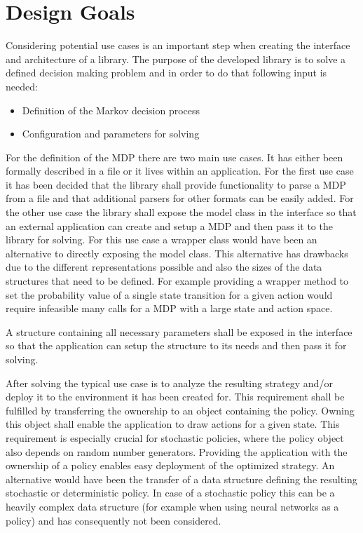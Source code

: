 \chapter {Design Goals}
\label{goals}

Considering potential use cases is an important step when creating the interface and architecture of a library. The purpose of the developed library is to solve a defined decision making problem and in order to do that following input is needed:

\begin{itemize}
	\item Definition of the Markov decision process
	\item Configuration and parameters for solving
\end{itemize}

For the definition of the MDP there are two main use cases. It has either been formally described in a file or it lives within an application. For the first use case it has been decided that the library shall provide functionality to parse a MDP from a file and that additional parsers for other formats can be easily added. For the other use case the library shall expose the model class in the interface so that an external application can create and setup a MDP and then pass it to the library for solving. For this use case a wrapper class would have been an alternative to directly exposing the model class. This alternative has drawbacks due to the different representations possible and also the sizes of the data structures that need to be defined. For example providing a wrapper method to set the probability value of a single state transition for a given action would require infeasible many calls for a MDP with a large state and action space. 

A structure containing all necessary parameters shall be exposed in the interface so that the application can setup the structure to its needs and then pass it for solving. 

After solving the typical use case is to analyze the resulting strategy and/or deploy it to the environment it has been created for. This requirement shall be fulfilled by transferring the ownership to an object containing the policy. Owning this object shall enable the application to draw actions for a given state. This requirement is especially crucial for stochastic policies, where the policy object also depends on random number generators. Providing the application with the ownership of a policy enables easy deployment of the optimized strategy. An alternative would have been the transfer of a data structure defining the resulting stochastic or deterministic policy. In case of a stochastic policy this can be a heavily complex data structure (for example when using neural networks as a policy) and has consequently not been considered. 

